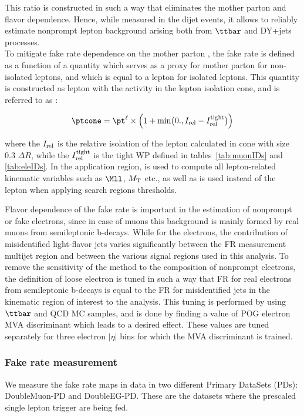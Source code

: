 This ratio is constructed in such a way that eliminates the mother parton \pt and flavor dependence.
Hence, while measured in the dijet events, it allows to reliably estimate nonprompt lepton background
arising both from $\ttbar$ and DY+jets processes. \\
To mitigate fake rate dependence on the mother parton \pt, the fake rate is defined as a function
of a quantity which serves as a proxy for mother parton \pt for non-isolated leptons, and which
is equal to a lepton \pt for isolated leptons. This quantity is constructed as lepton \pt with 
the activity in the lepton isolation cone, and is referred to as \ptcone:

\begin{equation}
\ptcone = \pt^\ell\times\Bigl(1+ \min\bigl(0., \Irel - \Irel^\text{tight}\bigr) \Bigr)
\end{equation}

\noindent where the $I_{\mathrm{rel}}$ is the relative isolation of the lepton calculated in cone with size 0.3 $\Delta R$, while the $I_{\mathrm{rel}}^\text{tight}$ is the tight WP defined in tables~\ref{tab:muonIDs} and \ref{tab:eleIDs}.
In the application region, \ptcone is used to compute all lepton-related kinematic variables
such as $\Mll$, $M_{\mathrm{T}}$ etc., as well as is used instead of the lepton \pt when applying 
search regions \pt thresholds.

Flavor dependence of the fake rate is important in the estimation of nonprompt or fake electrons, 
since in case of muons this background is mainly formed by real muons from semileptonic b-decays.
While for the electrons, the contribution of misidentified light-flavor jets varies significantly between 
the FR measurement multijet region and between the various signal regions used in this analysis. 
To remove the sensitivity of the method to the composition of nonprompt electrons, the definition
of loose electron is tuned in such a way that FR for real electrons from semileptonic b-decays
is equal to the FR for misidentified jets in the kinematic region of interest to the analysis. 
This tuning is performed by using $\ttbar$ and QCD MC samples, and is done by finding a value of 
POG electron MVA discriminant which leads to a desired effect. These values are tuned separately 
for three electron $|\eta|$ bins for which the MVA discriminant is
trained. 

\subsubsection{Fake rate measurement} \label{sec:singleFR}
We measure the fake rate maps in data in two different Primary DataSets (PDs): DoubleMuon-PD and DoubleEG-PD.
These are the datasets where the prescaled single lepton trigger are being fed.

